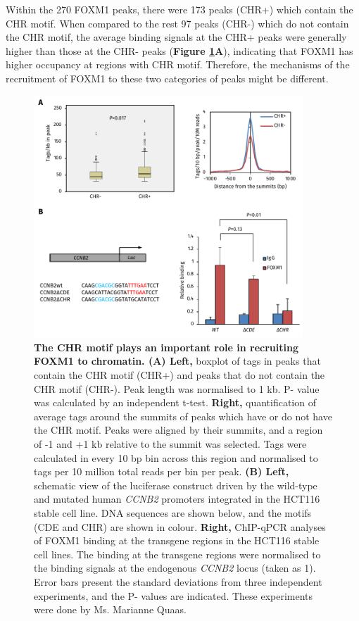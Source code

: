 Within the 270 FOXM1 peaks, there were 173 peaks (CHR+) which contain the CHR motif. When compared to the rest 97 peaks (CHR-) which do not contain the CHR motif, the average binding signals at the CHR+ peaks were generally higher than those at the CHR- peaks (\textbf{Figure \ref{fig:fig27}A}), indicating that FOXM1 has higher occupancy at regions with CHR motif. Therefore, the mechanisms of the recruitment of FOXM1 to these two categories of peaks might be different.

\begin{figure}[!h]
    \centering
    \includegraphics[width=0.9\textwidth]{chapter3/figures_foxm1/fig27.pdf}
    \caption[The CHR motif plays an important role in recruiting FOXM1 to chromatin]{\textbf{The CHR motif plays an important role in recruiting FOXM1 to chromatin. (A) Left,} boxplot of tags in peaks that contain the CHR motif (CHR+) and peaks that do not contain the CHR motif (CHR-). Peak length was normalised to 1 kb. P- value was calculated by an independent t-test. \textbf{Right,} quantification of average tags around the summits of peaks which have or do not have the CHR motif. Peaks were aligned by their summits, and a region of -1 and +1 kb relative to the summit was selected. Tags were calculated in every 10 bp bin across this region and normalised to tags per 10 million total reads per bin per peak. \textbf{(B) Left,} schematic view of the luciferase construct driven by the wild-type and mutated human \textit{CCNB2} promoters integrated in the HCT116 stable cell line. DNA sequences are shown below, and the motifs (CDE and CHR) are shown in colour. \textbf{Right,} ChIP-qPCR analyses of FOXM1 binding at the transgene regions in the HCT116 stable cell lines. The binding at the transgene regions were normalised to the binding signals at the endogenous \textit{CCNB2} locus (taken as 1). Error bars present the standard deviations from three independent experiments, and the P- values are indicated. These experiments were done by Ms. Marianne Quaas.}
    \label{fig:fig27}
\end{figure}

